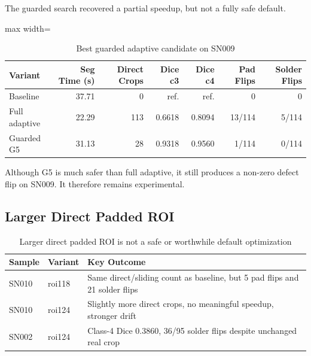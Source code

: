 The guarded search recovered a partial speedup, but not a fully safe
default.

\begin{table}[H]
\centering
\caption{Best guarded adaptive candidate on SN009}
\label{tab:guarded-adaptive}
\begin{adjustbox}{max width=\textwidth}
\renewcommand{\arraystretch}{1.15}
\begin{tabular}{l rr rr rr}
\toprule
\textbf{Variant} & \textbf{Seg Time (s)} & \textbf{Direct Crops} & \textbf{Dice c3} & \textbf{Dice c4} & \textbf{Pad Flips} & \textbf{Solder Flips} \\
\midrule
Baseline        & 37.71 &   0 & ref.   & ref.   & 0      & 0 \\
Full adaptive   & 22.29 & 113 & 0.6618 & 0.8094 & 13/114 & 5/114 \\
Guarded G5      & 31.13 &  28 & 0.9318 & 0.9560 & 1/114  & 0/114 \\
\bottomrule
\end{tabular}
\end{adjustbox}
\end{table}

Although G5 is much safer than full adaptive, it still produces
a non-zero defect flip on SN009. It therefore remains
experimental.

\hypertarget{larger-direct-padded-roi-1}{%
\subsection{Larger Direct Padded ROI}\label{larger-direct-padded-roi-1}}

\begin{table}[H]
\centering
\caption{Larger direct padded ROI is not a safe or worthwhile default optimization}
\label{tab:larger-roi}
\renewcommand{\arraystretch}{1.15}
\begin{tabular}{l l p{}}
\toprule
\textbf{Sample} & \textbf{Variant} & \textbf{Key Outcome} \\
\midrule
SN010 & roi118 & Same direct/sliding count as baseline, but 5 pad flips and 21 solder flips \\
SN010 & roi124 & Slightly more direct crops, no meaningful speedup, stronger drift \\
SN002 & roi124 & Class-4 Dice 0.3860, 36/95 solder flips despite unchanged real crop \\
\bottomrule
\end{tabular}
\end{table}

